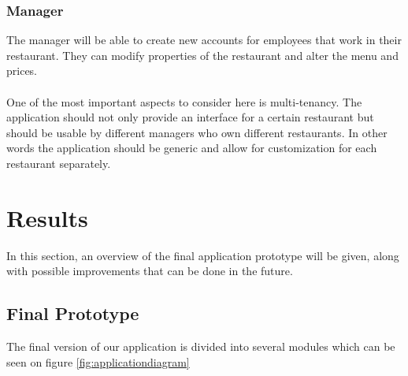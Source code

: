 \documentclass[12pt]{article}
\begin{document}
\begin{multicols}{2}
\subsubsection{Manager}
The manager will be able to create new accounts for employees that work in their restaurant. They can modify properties of the restaurant and alter the menu and prices. 
\\\\
One of the most important aspects to consider here is multi-tenancy. The application should not only provide an interface for a certain restaurant but should be usable by different managers who own different restaurants. In other words the application should be generic and allow for customization for each restaurant separately.

\section{Results}\label{sec:results}
In this section, an overview of the final application prototype will be given, along with possible improvements that can be done in the future.
\subsection{Final Prototype}
The final version of our application is divided into several modules which can be seen on figure \ref{fig:applicationdiagram}


\end{multicols}
\end{document}
